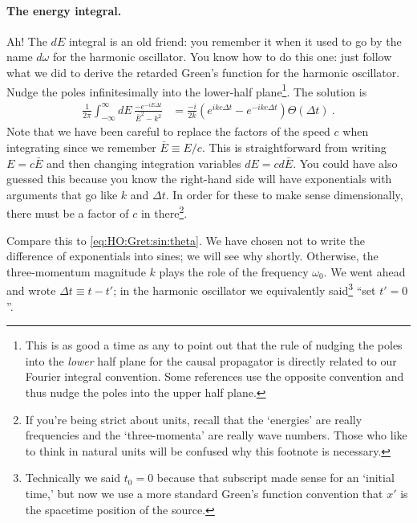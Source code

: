 \paragraph{The energy integral.} Ah! The $dE$ integral is an old friend: you remember it when it used to go by the name $d\omega$ for the harmonic oscillator. You know how to do this one: just follow what we did to derive the retarded Green's function for the harmonic oscillator. Nudge the poles infinitesimally into the lower-half plane\footnote{This is as good a time as any to point out that the rule of nudging the poles into the \emph{lower} half plane for the causal propagator is directly related to our Fourier integral convention. Some references use the opposite convention and thus nudge the poles into the upper half plane.}. The solution is
\begin{align}
	 \frac{1}{2\pi}\int_{-\infty}^\infty dE \, 
	\frac{-e^{-iE \Delta t}}{\bar{E}^2-k^2}
	&= \frac{-i}{2k}\left(e^{ikc\Delta t} - e^{-ikc\Delta t}\right)\Theta(\Delta t) \ .
\end{align}
Note that we have been careful to replace the factors of the speed $c$ when integrating since we remember $\bar E \equiv E/c$. This is straightforward from writing $E = c\bar E$ and then changing integration variables $dE = cd\bar{E}$. You could have also guessed this because you know the right-hand side will have exponentials with arguments that go like $k$ and $\Delta t$. In order for these to make sense dimensionally, there must be a factor of $c$ in there\footnote{If you're being strict about units, recall that the `energies' are really frequencies and the `three-momenta' are really wave numbers. Those who like to think in natural units will be confused why this footnote is necessary.}.

Compare this to \eqref{eq:HO:Gret:sin:theta}. We have chosen not to write the difference of exponentials into sines; we will see why shortly. Otherwise, the three-momentum magnitude $k$ plays the role of the frequency $\omega_0$. We went ahead and wrote $\Delta t \equiv t-t'$; in the harmonic oscillator we equivalently said\footnote{Technically we said $t_0=0$ because that subscript made sense for an `initial time,' but now we use a more standard Green's function convention that $x'$ is the spacetime position of the source.} ``set $t'=0$''. 

